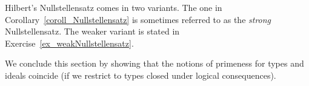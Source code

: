 \documentclass[creche.tex]{subfiles}
\begin{document}
Hilbert's Nullstellensatz comes in two variants. The one in Corollary~\ref{coroll_Nullstellensatz} is sometimes referred to as the \textit{strong\/}  Nullstellensatz. The weaker variant is stated in Exercise~\ref{ex_weakNullstellensatz}.




% 
% 
% 
% 
% 
% 


We conclude this section by showing that the notions of primeness for types and ideals coincide (if we restrict to types closed under logical consequences).
\end{document}
